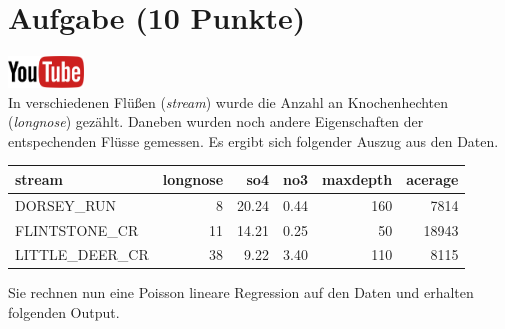 \documentclass[a4paper, 10pt]{scrartcl}\usepackage[]{graphicx}\usepackage[]{xcolor}
\newenvironment{knitrout}{}{} %
\begin{document}
\clearpage

\section{Aufgabe \hfill (10 Punkte)}

\hfill\href{https://youtu.be/K_28Ne6ladI}{\includegraphics[width =
  2cm]{img/youtube}}\\[1Ex]




In verschiedenen Fl{\"u}{\ss}en (\textit{stream}) wurde die Anzahl an
Knochenhechten (\textit{longnose}) gez{\"a}hlt. Daneben wurden noch andere
Eigenschaften der entspechenden Fl{\"u}sse gemessen. Es ergibt sich folgender
Auszug aus den Daten. 


\begin{knitrout}
\color{fgcolor}\begin{table}[!h]
\centering
\begin{tabular}{lrrrrr}
\toprule
stream & longnose & so4 & no3 & maxdepth & acerage\\
\midrule
DORSEY\_RUN & 8 & 20.24 & 0.44 & 160 & 7814\\
FLINTSTONE\_CR & 11 & 14.21 & 0.25 & 50 & 18943\\
LITTLE\_DEER\_CR & 38 & 9.22 & 3.40 & 110 & 8115\\
\bottomrule
\end{tabular}
\end{table}

\end{knitrout}


Sie rechnen nun eine Poisson lineare Regression auf den Daten und erhalten
folgenden \Rlogo Output.
\end{document}
